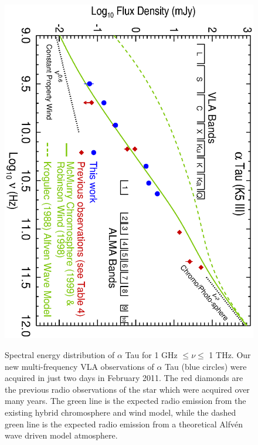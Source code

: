 \documentclass[iop]{emulateapj}
\begin{document}
\begin{figure}
\includegraphics[trim = 0mm 0mm 0mm 20mm, clip,scale=0.65, angle=90]{fig2.ps}
\\
\caption{Spectral energy distribution of $\alpha$ Tau for 1 GHz $\leq \nu \leq$ 1 THz. Our new multi-frequency VLA observations of $\alpha$ Tau (blue circles) were acquired in just two days in February 2011. The red diamonds are the previous radio observations of the star which were acquired over many years. The green line is the expected radio emission from the existing hybrid chromosphere and wind model, while the dashed  green line is the expected radio emission from a theoretical Alfv\'en wave driven model atmosphere.}
\label{fig:fig2}
\end{figure}
\end{document}
